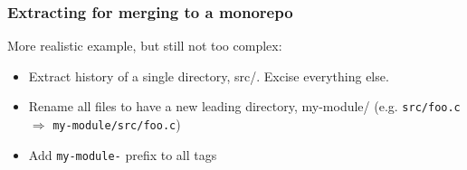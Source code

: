 \documentclass[compress,t,aspectratio=169]{beamer}
\begin{document}

\begin{frame}
  \frametitle{Extracting for merging to a monorepo}

  More realistic example, but still not too complex:
  \begin{itemize}
    \item Extract history of a single directory, src/.
          Excise everything else.
    \item Rename all files to have a new leading directory, my-module/
          (e.g. \texttt{src/foo.c} $\Rightarrow$ \texttt{my-module/src/foo.c})
    \item Add \texttt{my-module-} prefix to all tags
  \end{itemize}

\end{frame}

\end{document}
